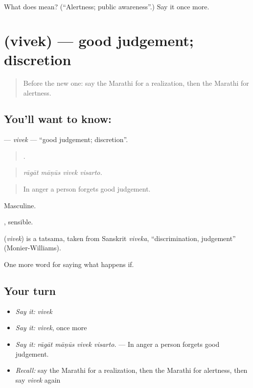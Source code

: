 \begin{tcolorbox}[breakable,colback=teal!4,colframe=teal!35!black,title={Before you move on}]
What does  mean? (\textquotedblleft{}Alertness; public awareness\textquotedblright{}.) Say it once more.
\end{tcolorbox}
\section[\texorpdfstring{\mr{विवेक} (vivek)}{विवेक (vivek)}]{ (vivek) — good judgement; discretion}

\label{lesson:MR-C394-vivek}



\begin{quote}
Before the new one: say the Marathi for a realization, then the Marathi for alertness.
\end{quote}

\subsection*{You'll want to know: }
\textbf{} — \emph{vivek} — \textquotedblleft{}good judgement; discretion\textquotedblright{}.

\begin{quote}
   .
\end{quote}

\begin{quote}
\emph{rāgāt māṇūs vivek visarto.}
\end{quote}

\begin{quote}
In anger a person forgets good judgement.
\end{quote}

Masculine.

, sensible.

\begin{cousinweb}
\textbf{} (\emph{vivek}) is a tatsama, taken from Sanskrit \emph{viveka}, \textquotedblleft{}discrimination, judgement\textquotedblright{} (Monier-Williams).
\end{cousinweb}

\begin{grammarlens}[title={What you've built}]
One more word for saying what happens if.
\end{grammarlens}

\subsection*{Your turn}
\begin{itemize}
\raggedright
  \item \emph{Say it:} \emph{vivek}
  \item \emph{Say it:} \emph{vivek}, once more
  \item \emph{Say it:} \emph{rāgāt māṇūs vivek visarto.} — In anger a person forgets good judgement.
  \item \emph{Recall:} say the Marathi for a realization, then the Marathi for alertness, then say \emph{vivek} again
\end{itemize}


